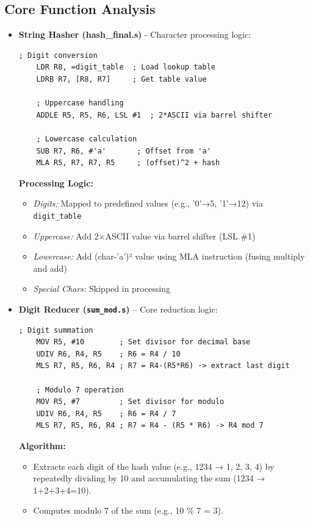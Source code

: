 \documentclass[a4paper,12pt]{article}
\newenvironment{sectionbox}[1]{%
    \tcolorbox[
        colback=titleblue!5,
        colframe=titleblue!50,
        arc=3mm,
        title=#1,
        fonttitle=\bfseries\sffamily,
        before skip=1.2em,
        after skip=1.2em
    ]
}{\endtcolorbox}
\begin{document}
\begin{sectionbox}{Technical Implementation}
\subsection*{Core Function Analysis}

\begin{itemize}[leftmargin=2em]

    \item \textbf{String Hasher (hash\_final.s)} - Character processing logic:
    \begin{lstlisting}[language={[x86masm]Assembler}]
    ; Digit conversion
    LDR R8, =digit_table  ; Load lookup table
    LDRB R7, [R8, R7]     ; Get table value
    
    ; Uppercase handling
    ADDLE R5, R5, R6, LSL #1  ; 2*ASCII via barrel shifter
    
    ; Lowercase calculation
    SUB R7, R6, #'a'       ; Offset from 'a'
    MLA R5, R7, R7, R5     ; (offset)^2 + hash
    \end{lstlisting}

    \textbf{Processing Logic:}
    \begin{itemize}
        \item \textit{Digits:} Mapped to predefined values (e.g., '0'→5, '1'→12) via \texttt{digit\_table}
        \item \textit{Uppercase:} Add 2×ASCII value via barrel shifter (LSL \#1)
        \item \textit{Lowercase:} Add (char-'a')² value using MLA instruction (fusing multiply and add)
        \item \textit{Special Chars:} Skipped in processing
    \end{itemize}

\item \textbf{Digit Reducer (\texttt{sum\_mod.s})} – Core reduction logic:
\begin{lstlisting}[language={[x86masm]Assembler}]
    ; Digit summation
    MOV R5, #10        ; Set divisor for decimal base
    UDIV R6, R4, R5    ; R6 = R4 / 10
    MLS R7, R5, R6, R4 ; R7 = R4-(R5*R6) -> extract last digit
    
    ; Modulo 7 operation
    MOV R5, #7         ; Set divisor for modulo
    UDIV R6, R4, R5    ; R6 = R4 / 7
    MLS R7, R5, R6, R4 ; R7 = R4 - (R5 * R6) -> R4 mod 7
\end{lstlisting}

\textbf{Algorithm:}
    \begin{itemize}
    \item Extracts each digit of the hash value (e.g., 1234 → 1, 2, 3, 4) by repeatedly dividing by 10 and accumulating the sum (1234 → 1+2+3+4=10).
    \item Computes modulo 7 of the sum (e.g., 10 \% 7 = 3). 
    \end{itemize}
\end{itemize}
\end{sectionbox}
\end{document}
